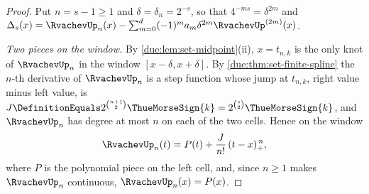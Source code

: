 \documentclass[11pt,oneside]{article}
\theoremstyle{plain}
\theoremstyle{definition}
\theoremstyle{remark}
\newcommand{\upn}[1]{\RvachevUp_{#1}}
\newcommand{\am}[1]{a_{#1}}                                 %
\begin{document}
\begin{proof}
Put $n=s-1\ge1$ and $\delta=\delta_{n}=2^{-s}$, so that $4^{-ms}=\delta^{2m}$
and $\Delta_{s}(x)=\upn{n}(x)-\sum_{m=0}^{d}(-1)^{m}\am{m}\delta^{2m}
\RvachevUp^{(2m)}(x)$.

\emph{Two pieces on the window.}
By \cref{due:lem:set-midpoint}(ii), $x=t_{n,k}$ is the only knot of
$\upn{n}$ in the window $[x-\delta,x+\delta]$.  By
\cref{due:thm:set-finite-spline} the $n$-th derivative of $\upn{n}$ is a
step function whose jump at $t_{n,k}$, right value minus left value, is
$J\DefinitionEquals2^{\binom{n+1}{2}}\ThueMorseSign{k}=2^{\binom s2}\ThueMorseSign{k}$,
and $\upn{n}$ has degree at most $n$ on each of the two cells.  Hence on
the window
\begin{equation}
 \upn{n}(t)=P(t)+\frac{J}{n!}\,(t-x)_{+}^{\,n},
 \label{due:eq:sharp-two-pieces}
\end{equation}
where $P$ is the polynomial piece on the left cell, and, since
$n\ge1$ makes $\upn{n}$ continuous, $\upn{n}(x)=P(x)$.


\end{proof}
\end{document}

